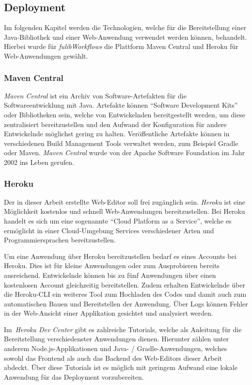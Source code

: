 \subsection{Deployment}\label{subsec:deployment}
Im folgenden Kapitel werden die Technologien, welche für die Bereitstellung einer Java-Bibliothek und einer Web-Anwendung verwendet werden können, behandelt.
Hierbei wurde für \textit{fulibWorkflows} die Plattform Maven Central und Heroku für Web-Anwendungen gewählt.

\subsubsection{Maven Central}\label{subsubsec:mavencentral}
\textit{Maven Central} ist ein Archiv von Software-Artefakten für die Softwareentwicklung mit Java.
Artefakte können ``Software Development Kits'' oder Bibliotheken sein, welche von Entwickelnden bereitgestellt werden, um diese zentralisiert bereitzustellen
und den Aufwand der Konfiguration für andere Entwickelnde möglichst gering zu halten.
Veröffentliche Artefakte können in verschiedenen Build Management Tools verwaltet werden, zum Beispiel Gradle oder Maven.
\textit{Maven Central} wurde von der Apache Software Foundation im Jahr 2002 ins Leben gerufen\cite*{maven}.

\subsubsection{Heroku}\label{subsubsec:heroku}
Der in dieser Arbeit erstellte Web-Editor soll frei zugänglich sein.
\textit{Heroku} ist eine Möglichkeit kostenlos und schnell Web-Anwendungen bereitzustellen.
Bei Heroku handelt es sich um eine sogenannte ``Cloud Platform as a Service'', welche es ermöglicht in einer Cloud-Umgebung
Services verschiedener Arten und Programmiersprachen bereitzustellen\cite*{heroku}.

Um eine Anwendung über Heroku bereitzustellen bedarf es eines Accounts bei Heroku.
Dies ist für kleine Anwendungen oder zum Ausprobieren bereits ausreichend.
Entwickelnde können bis zu fünf Anwendungen über einen kostenlosen Account gleichzeitig bereitstellen.
Zudem erhalten Entwickelnde über die Heroku-\ac{CLI} ein weiteres Tool zum Hochladen des Codes und damit auch zum automatischen
Bauen und Bereitstellen der Anwendung.
Über Logs können Fehler in der Web-Ansicht einer Applikation gesichtet und analysiert werden.

Im~\textit{Heroku Dev Center} gibt es zahlreiche Tutorials, welche als Anleitung für die Bereitstellung verschiedenster Anwendungen dienen.
Hierunter zählen unter anderem Node.js-Applikationen und Java- / Gradle-Anwendungen, welches sowohl das Frontend als auch das Backend
des Web-Editors dieser Arbeit abdeckt\cite*{herokuDev}.
Über diese Tutorials ist es möglich mit geringem Aufwand eine lokale Anwendung für das Deployment vorzubereiten.
